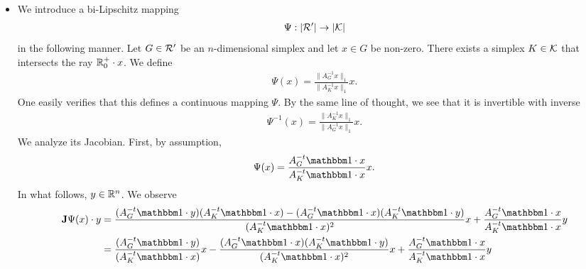 \documentclass[10pt,a4paper]{article}
\begin{document}
\begin{itemize}
        \item 
        We introduce a bi-Lipschitz mapping 
        \begin{align*}
            \Psi : |{\mathcal R}'| \rightarrow |{\mathcal K}|
        \end{align*}
        in the following manner. Let ${G} \in {\mathcal R}'$ be an $n$-dimensional simplex and let $x \in {G}$ be non-zero. There exists a simplex $K \in {\mathcal K}$ that intersects the ray ${\mathbb R}_0^+ \cdot x$.
        We define 
        \begin{align*}
            \Psi(x) 
            = 
            \frac{ \| A_{{G}}^{-1} x \|_{1} }{ \| A_{K}^{-1} x \|_{1} } x
            .
        \end{align*}
        One easily verifies that this defines a continuous mapping $\Psi$. 
        By the same line of thought, we see that it is invertible with inverse 
        \begin{align*}
            \Psi^{-1}(x) 
            = 
            \frac{ \| A_{K}^{-1} x \|_{1} }{ \| A_{{G}}^{-1} x \|_{1} } x
            .
        \end{align*}
        We analyze its Jacobian. 
        First, by assumption,
        \begin{align*}
            \Psi(x) 
            = 
            \frac{ A_{{G}}^{-t} \vecone \cdot x }{ A_{K}^{-t} \vecone \cdot x } x
            .
        \end{align*}
        In what follows, $y \in {\mathbb R}^n$. We observe 
        \begin{align*}
            \Jacobian \Psi(x) \cdot y 
            &= 
            \frac{ 
                ( A_{{G}}^{-t} \vecone \cdot y ) 
                ( A_{K}^{-t} \vecone \cdot x )
                -
                ( A_{{G}}^{-t} \vecone \cdot x )
                ( A_{K}^{-t} \vecone \cdot y ) 
            }{ 
                ( A_{K}^{-t} \vecone \cdot x )^2
            } 
            x
            + 
            \frac{ A_{{G}}^{-t} \vecone \cdot x }{ A_{K}^{-t} \vecone \cdot x } y
            \\&= 
            \frac{ 
                ( A_{{G}}^{-t} \vecone \cdot y ) 
            }{ 
                ( A_{K}^{-t} \vecone \cdot  x )
            } 
            x
            -
            \frac{ 
                ( A_{{G}}^{-t} \vecone \cdot x )
                ( A_{K}^{-t} \vecone \cdot y ) 
            }{ 
                ( A_{K}^{-t} \vecone \cdot  x )^2
            } 
            x
            + 
            \frac{ A_{{G}}^{-t} \vecone \cdot x }{ A_{K}^{-t} \vecone \cdot  x } y

\end{align*}
\end{itemize}
\end{document}
